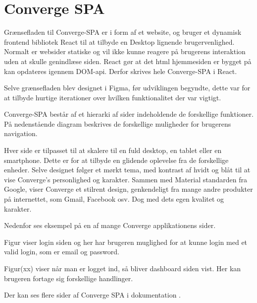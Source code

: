 \section{Converge SPA}
Grænsefladen til Converge-SPA er i form af et website, og bruger et dynamisk frontend bibliotek React til at tilbyde en Desktop lignende brugervenlighed. Normalt er websider statiske og vil ikke kunne reagere på brugerens interaktion uden at skulle genindlæse siden. React gør at det html hjemmesiden er bygget på kan opdateres igennem DOM-api. Derfor skrives hele Converge-SPA i React. 

Selve grænsefladen blev designet i Figma, før udviklingen begyndte, dette var for at tilbyde hurtige iterationer over hvilken funktionalitet der var vigtigt.

Converge-SPA består af et hierarki af sider indeholdende de forskellige funktioner. På nedenstående diagram beskrives de forskellige muligheder for brugerens navigation.


Hver side er tilpasset til at skalere til en fuld desktop, en tablet eller en smartphone. Dette er for at tilbyde en glidende oplevelse fra de forskellige enheder. Selve designet følger et mørkt tema, med kontrast af hvidt og blåt til at vise Converge’s personlighed og karakter. Sammen med Material standarden fra Google, viser Converge et stilrent design, genkendeligt fra mange andre produkter på internettet, som Gmail, Facebook osv. Dog med dets egen kvalitet og karakter.

Nedenfor ses eksempel på en af mange Converge applikationens sider.


Figur viser login siden og her har brugeren muglighed for at kunne login med et valid login, som er
email og password.


Figur(xx) viser når man er logget ind, så bliver dashboard siden vist. Her kan
brugeren fortage sig forskellige handlinger. 

Der kan ses flere sider af Converge SPA i dokumentation \cite{system-interface}.